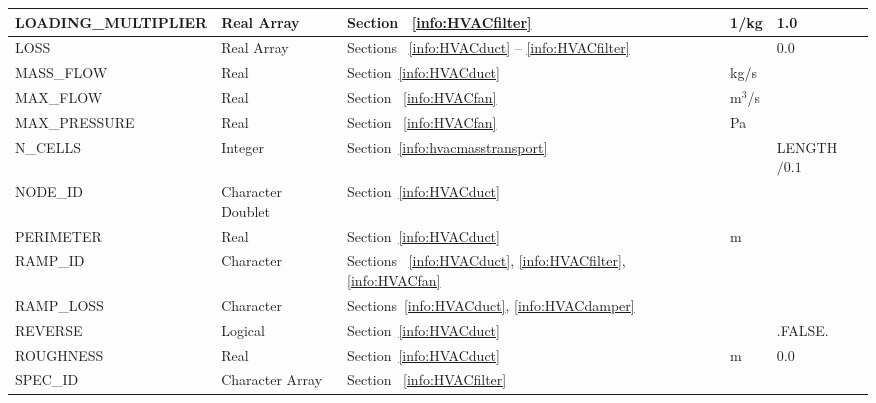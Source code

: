 \documentclass[11pt]{book}
\begin{document}
\begin{longtable}{@{\extracolsep{\fill}}|l|l|l|l|l|}
{\ct LOADING\_MULTIPLIER}       & Real Array        & Section ~\ref{info:HVACfilter}                                                & 1/kg          & 1.0            \\ \hline
{\ct LOSS}                      & Real Array        & Sections ~\ref{info:HVACduct} -- \ref{info:HVACfilter}                        &               & 0.0            \\ \hline
{\ct MASS\_FLOW  }              & Real              & Section~\ref{info:HVACduct}                                                   &  kg/s         &                \\ \hline
{\ct MAX\_FLOW}                 & Real              & Section ~\ref{info:HVACfan}                                                   &  m$^3$/s      &                \\ \hline
{\ct MAX\_PRESSURE}             & Real              & Section ~\ref{info:HVACfan}                                                   &  Pa           &                \\ \hline
{\ct N\_CELLS}                  & Integer           & Section~\ref{info:hvacmasstransport}                                          &               &{\ct LENGTH}\(/0.1\)  \\ \hline
{\ct NODE\_ID}                  & Character Doublet & Section~\ref{info:HVACduct}                                                   &               &                \\ \hline
{\ct PERIMETER}                 & Real              & Section~\ref{info:HVACduct}                                                   &  m            &                \\ \hline
{\ct RAMP\_ID}                  & Character         & Sections ~\ref{info:HVACduct}, \ref{info:HVACfilter}, \ref{info:HVACfan}      &               &                \\ \hline
{\ct RAMP\_LOSS}                & Character         & Sections~\ref{info:HVACduct}, \ref{info:HVACdamper}                           &               &                \\ \hline
{\ct REVERSE}                   & Logical           & Section~\ref{info:HVACduct}                                                   &               & {\ct .FALSE.}  \\ \hline
{\ct ROUGHNESS}                 & Real              & Section~\ref{info:HVACduct}                                                   &  m            & 0.0            \\ \hline
{\ct SPEC\_ID}                  & Character Array   & Section ~\ref{info:HVACfilter}                                                &               &                \\ \hline

\end{longtable}
\end{document}
